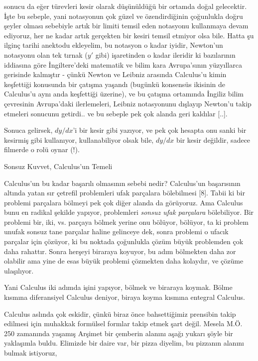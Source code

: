 \documentclass[12pt,fleqn]{article}\usepackage{../../common}
\begin{document}
sonucu da eğer türevleri kesir olarak düşünüldüğü bir ortamda doğal
gelecektir. İşte bu sebeple, yani notasyonun çok güzel ve özendirdiğinin
çoğunlukla doğru şeyler olması sebebiyle artık bir limiti temsil eden
notasyonu kullanmaya devam ediyoruz, her ne kadar artık gerçekten bir
kesiri temsil etmiyor olsa bile. Hatta şu ilginç tarihi anektodu ekleyelim,
bu notasyon o kadar iyidir, Newton'un notasyonu olan tek tırnak ($y'$ gibi)
işaretinden o kadar ileridir ki bazılarının iddiasına göre İngiltere'deki
matematik ve bilim kara Avrupa'sının yüzyıllarca gerisinde kalmıştır -
çünkü Newton ve Leibniz arasında Calculus'u kimin keşfettiği konusunda bir
çatışma yaşandı (bugünkü konsensüs ikisinin de Calculus'u aynı anda
keşfettiği üzerine), ve bu çatışma ortamında İngiliz bilim çevresinin
Avrupa'daki ilerlemeleri, Leibniz notasyonunu dışlayıp Newton'u takip
etmeleri sonucunu getirdi.. ve bu sebeple pek çok alanda geri kaldılar
[..].

Sonuca gelirsek, $dy/dx$'i bir kesir gibi yazıyor, ve pek çok hesapta onu
sanki bir kesirmiş gibi kullanıyor, kullanabiliyor olsak bile, $dy/dx$ bir
kesir değildir, sadece filmerde o rolü oynar (!).

Sonsuz Kuvvet, Calculus'un Temeli

Calculus'un bu kadar başarılı olmasının sebebi nedir? Calculus'un
başarısının altında yatan sır çetrefil problemleri ufak parçalara
bölebilmesi [8]. Tabii ki bir problemi parçalara bölmeyi pek çok diğer
alanda da görüyoruz. Ama Calculus bunu en radikal şekilde yapıyor,
problemleri {\em sonsuz ufak parçalara} bölebiliyor. Bir problemi bir, iki,
vs. parçaya bölmek yerine onu bölüyor, bölüyor, ta ki problem unufak sonsuz
tane parçalar haline gelinceye dek, sonra problemi o ufacık parçalar için
çözüyor, ki bu noktada çoğunlukla çözüm büyük problemden çok daha rahattır.
Sonra herşeyi biraraya koyuyor, bu adım bölmekten daha zor olabilir ama
yine de esas büyük problemi çözmekten daha kolaydır, ve çözüme ulaşılıyor.

Yani Calculus iki adımda işini yapıyor, bölmek ve biraraya koymak. Bölme
kısmına diferansiyel Calculus deniyor, biraya koyma kısmına entegral
Calculus.

Calculus aslında çok eskidir, çünkü biraz önce bahsettiğimiz prensibin
takip edilmesi için muhakkak formülsel formlar takip etmek şart
değil. Mesela M.Ö. 250 zamanında yaşamış Arşimet bir çemberin alanını aşağı
yukarı şöyle bir yaklaşımla buldu. Elimizde bir daire var, bir pizza
diyelim, bu pizzanın alanını bulmak istiyoruz,
\end{document}
